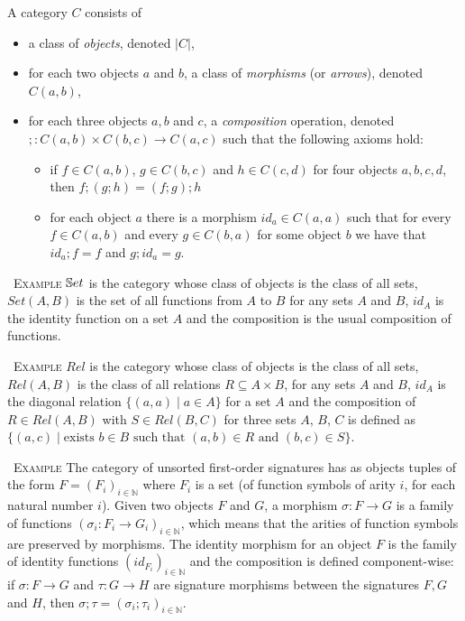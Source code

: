 \documentclass[10pt, a4paper]{isov2}
\renewenvironment{example}[0]{\ \newline \textsc{Example}\quad }{}
\begin{document}
\begin{definition}
A category $C$ consists of 
\begin{itemize}
  \item a class of \emph{objects}, denoted $|C|$,

  \item for each two objects $a$ and $b$, a class of \emph{morphisms} (or \emph{arrows}), denoted $C(a,b)$,

  \item for each three objects $a, b$
and $c$,
a \emph{composition} operation, denoted
$; : C(a,b) \times C(b,c) \to C(a,c)$
such that the following axioms hold:
\begin{itemize}
  \item if $f \in C(a,b)$,
$g\in C(b,c)$
and $h \in C(c,d)$ for four objects $a,b,c,d$, then $f;(g;h) = (f;g);h$

  \item for each object $a$
there is a morphism $\mathit{id}_a\in C(a,a)$
such that for every $f \in C(a,b)$
and every $g \in C(b,a)$
for some object $b$ we have that $\mathit{id}_a;f = f$ and $g;\mathit{id}_a = g$.
\end{itemize}
\end{itemize} 
\end{definition}

\begin{example}
$\mathbb{S}et$
is the category whose class of objects is the class of all sets,
$\mathit{Set}(A,B)$
is the set of all functions from $A$
to $B$
for any sets $A$
and $B$,
$\mathit{id}_A$
is the identity function on a set $A$
and the composition is the usual composition of functions.
\end{example}

\begin{example}
$\mathit{Rel}$
is the category whose class of objects is the class of all sets,
$\mathit{Rel}(A,B)$
is the class of all relations $R \subseteq A \times B$,
for any sets $A$
and $B$,
$\mathit{id}_A$
is the diagonal relation $\{(a,a) \mid a \in A\}$
for a set $A$
and the composition of $R\in Rel(A,B)$
with $S \in \mathit{Rel}(B,C)$
for three sets $A$, $B$, $C$
is defined as
$\{(a,c) \mid \text{exists } b \in B \text{ such that } (a,b)\in R
\text{ and } (b,c)\in S\}$.
\end{example}

\begin{example}
The category of unsorted first-order signatures has as objects tuples of
the form $F = (F_i)_{i\in \mathbb{N}}$
where $F_i$
is a set (of function symbols of arity $i$,
for each natural number $i$).
Given two objects $F$
and $G$,
a morphism $\sigma: F \to G$
is a family of functions $(\sigma_i:F_i\to G_i)_{i\in\mathbb{N}}$,
which means that the arities of function symbols are preserved by
morphisms.  The identity morphism for an object $F$
is the family of identity functions
$(\mathit{id}_{F_i})_{i\in\mathbb{N}}$
and the composition is defined component-wise: if $\sigma:F \to G$
and $\tau:G \to H$
are signature morphisms between the signatures $F, G$
and $H$, then $\sigma;\tau = (\sigma_i;\tau_i)_{i\in\mathbb{N}}$.
\end{example}
\end{document}
